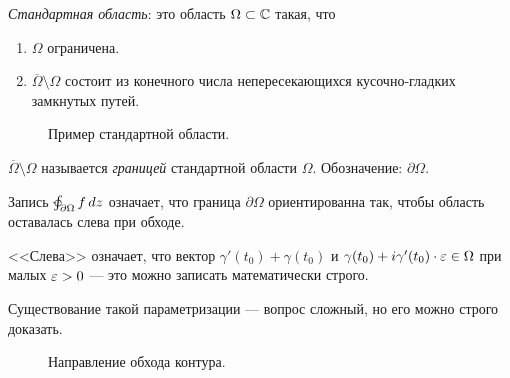 \documentclass[../complex-analysis.tex]{subfiles}
\begin{document}
\begin{df}
 \textit{Стандартная область}: это область  $ \Omega \subset \mathbb{C} $ такая, что
 \begin{enumerate}
  \item $ \Omega $ ограничена.
  \item $ \overline \Omega \setminus \Omega $ состоит из конечного числа непересекающихся кусочно-гладких замкнутых путей.
 \end{enumerate}
\end{df}

\begin{figure}[ht]
    \centering
    \caption{Пример стандартной области.}
    \label{fig:standart-region}
\end{figure}

\begin{df*}
 $ \overline \Omega \setminus \Omega $ называется \textit{границей} стандартной области $ \Omega $. Обозначение: $ \partial \Omega $.
\end{df*}

\begin{conventn*}
 Запись $\varointctrclockwise_{\partial \Omega} f \, dz $ означает, что граница $ \partial \Omega $ ориентированна так, чтобы область оставалась слева при обходе.

 <<Слева>> означает, что вектор $ \gamma'(t_0) + \gamma(t_0) $ и $ \gamma(t_0) + i\gamma'(t_0) \cdot \varepsilon \in \Omega $ при малых $ \varepsilon > 0 $ --- это можно записать математически строго.

 Существование такой параметризации --- вопрос сложный, но его можно строго доказать.
\end{conventn*}

\begin{figure}[ht]
    \centering
    \caption{Направление обхода контура.}
    \label{fig:region-traversal-direction}
\end{figure}
\end{document}
